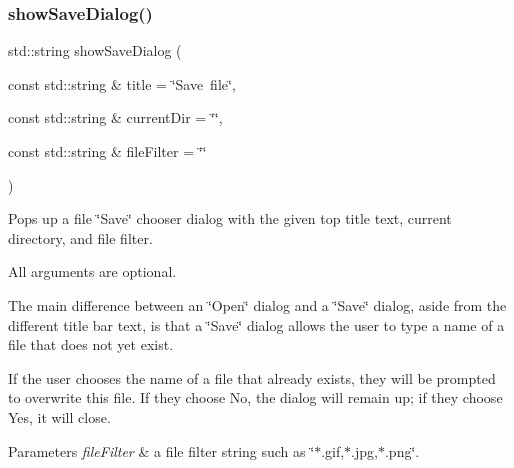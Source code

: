 \subsubsection{\texorpdfstring{show\+Save\+Dialog()}{showSaveDialog()}\hspace{0.1cm}{\footnotesize\ttfamily [1/3]}}
{\footnotesize\ttfamily std\+::string show\+Save\+Dialog (\begin{DoxyParamCaption}\item[{const std\+::string \&}]{title = {\ttfamily \char`\"{}Save~file\char`\"{}},  }\item[{const std\+::string \&}]{current\+Dir = {\ttfamily \char`\"{}\char`\"{}},  }\item[{const std\+::string \&}]{file\+Filter = {\ttfamily \char`\"{}\char`\"{}} }\end{DoxyParamCaption})\hspace{0.3cm}{\ttfamily [static]}}



Pops up a file \char`\"{}\+Save\char`\"{} chooser dialog with the given top title text, current directory, and file filter. 

All arguments are optional.

The main difference between an \char`\"{}\+Open\char`\"{} dialog and a \char`\"{}\+Save\char`\"{} dialog, aside from the different title bar text, is that a \char`\"{}\+Save\char`\"{} dialog allows the user to type a name of a file that does not yet exist.

If the user chooses the name of a file that already exists, they will be prompted to overwrite this file. If they choose No, the dialog will remain up; if they choose Yes, it will close. 
\begin{DoxyParams}{Parameters}
{\em file\+Filter} & a file filter string such as \char`\"{}$\ast$.\+gif,$\ast$.\+jpg,$\ast$.\+png\char`\"{}. \\
\hline
\end{DoxyParams}
\mbox{\label{classGFileChooser_ab1c47de23b7cb122ab4edc94ba672c47}} 
